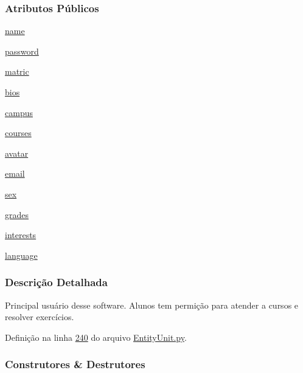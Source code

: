 \subsubsection*{Atributos Públicos}
\begin{DoxyCompactItemize}
\item 
\hyperlink{classELO_1_1EntityUnit_1_1Student_a33329ec1da0181f6305626b4444a8e0b}{name}
\item 
\hyperlink{classELO_1_1EntityUnit_1_1Student_a834cad492221bfe3f26e590666e13f9a}{password}
\item 
\hyperlink{classELO_1_1EntityUnit_1_1Student_a7a58dc9ae8d071372ef2036a82fcb3ae}{matric}
\item 
\hyperlink{classELO_1_1EntityUnit_1_1Student_a148e46f8d5bb2a3dedb9590edbb2471e}{bios}
\item 
\hyperlink{classELO_1_1EntityUnit_1_1Student_aeff51011a4e35705fb6aefc54e1d4f35}{campus}
\item 
\hyperlink{classELO_1_1EntityUnit_1_1Student_a4fc13f8b92b03ab40b6f97e753109056}{courses}
\item 
\hyperlink{classELO_1_1EntityUnit_1_1Student_a63479fe42a5a5e1dffc988221a807a6a}{avatar}
\item 
\hyperlink{classELO_1_1EntityUnit_1_1Student_ac072120adf3ee4078fe3ef7f17e61a1f}{email}
\item 
\hyperlink{classELO_1_1EntityUnit_1_1Student_a5ca85c1d00044512e5dc3cfabac4ff9f}{sex}
\item 
\hyperlink{classELO_1_1EntityUnit_1_1Student_a7ab2e46886024eced2bc61195dbc2008}{grades}
\item 
\hyperlink{classELO_1_1EntityUnit_1_1Student_a8777212f16975f658ff8f75e47f2c554}{interests}
\item 
\hyperlink{classELO_1_1EntityUnit_1_1Student_ad58a5d0f4e75b34e6c2b93ac05b59faf}{language}
\end{DoxyCompactItemize}


\subsubsection{Descrição Detalhada}
Principal usuário desse software. Alunos tem permição para atender a cursos e resolver exercícios. 

Definição na linha \hyperlink{EntityUnit_8py_source_l00240}{240} do arquivo \hyperlink{EntityUnit_8py_source}{Entity\+Unit.\+py}.



\subsubsection{Construtores \& Destrutores}
\hypertarget{classELO_1_1EntityUnit_1_1Student_aef59a6e543a5f05412f6550ff73d5e75}{}
